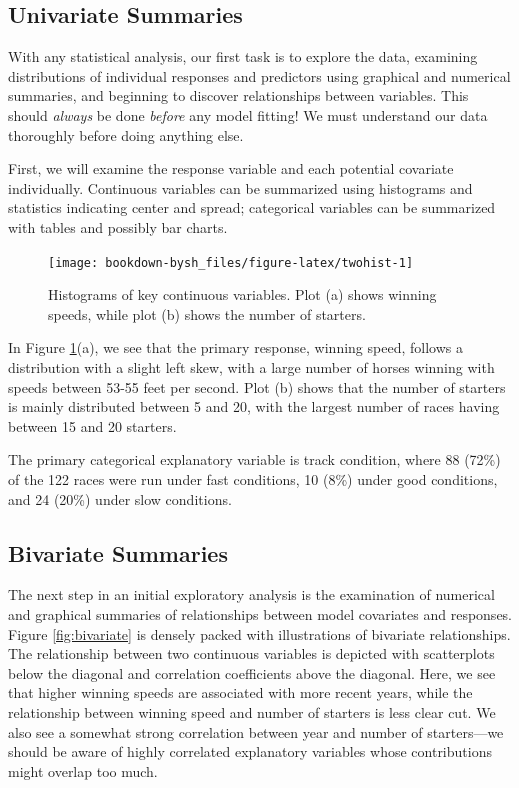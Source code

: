 \documentclass[
]{krantz}
\begin{document}
\hypertarget{univariate-summaries}{%
\subsection{Univariate Summaries}\label{univariate-summaries}}

With any statistical analysis, our first task is to explore the data, examining distributions of individual responses and predictors using graphical and numerical summaries, and beginning to discover relationships between variables. This should \emph{always} be done \emph{before} any model fitting! We must understand our data thoroughly before doing anything else.

First, we will examine the response variable and each potential covariate individually. Continuous variables can be summarized using histograms and statistics indicating center and spread; categorical variables can be summarized with tables and possibly bar charts.

\begin{figure}

{\centering \texttt{[image: bookdown-bysh\_files/figure-latex/twohist-1]} 

}

\caption{Histograms of key continuous variables.  Plot (a) shows winning speeds, while plot (b) shows the number of starters.}\label{fig:twohist}
\end{figure}

In Figure \ref{fig:twohist}(a), we see that the primary response, winning speed, follows a distribution with a slight left skew, with a large number of horses winning with speeds between 53-55 feet per second. Plot (b) shows that the number of starters is mainly distributed between 5 and 20, with the largest number of races having between 15 and 20 starters.

The primary categorical explanatory variable is track condition, where 88 (72\%) of the 122 races were run under fast conditions, 10 (8\%) under good conditions, and 24 (20\%) under slow conditions.

\hypertarget{bivariate-summaries}{%
\subsection{Bivariate Summaries}\label{bivariate-summaries}}

The next step in an initial exploratory analysis is the examination of numerical and graphical summaries of relationships between model covariates and responses. Figure \ref{fig:bivariate} is densely packed with illustrations of bivariate relationships. The relationship between two continuous variables is depicted with scatterplots below the diagonal and correlation coefficients above the diagonal. Here, we see that higher winning speeds are associated with more recent years, while the relationship between winning speed and number of starters is less clear cut. We also see a somewhat strong correlation between year and number of starters---we should be aware of highly correlated explanatory variables whose contributions might overlap too much.
\end{document}
